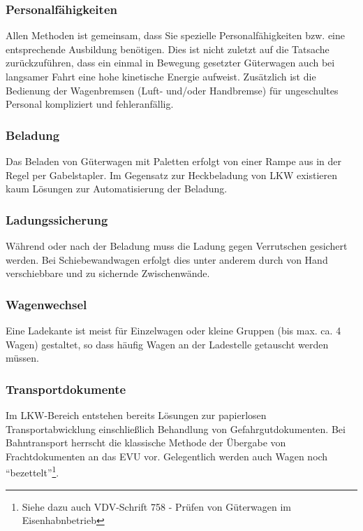 \subsubsection{Personalfähigkeiten}\label{sec:Personal}
Allen Methoden ist gemeinsam, dass Sie spezielle Personalfähigkeiten bzw. eine entsprechende Ausbildung benötigen. Dies ist nicht zuletzt auf die Tatsache zurückzuführen, dass ein einmal in Bewegung gesetzter Güterwagen auch bei langsamer Fahrt eine hohe kinetische Energie aufweist. Zusätzlich ist die Bedienung der Wagenbremsen (Luft- und/oder Handbremse) für ungeschultes Personal kompliziert und fehleranfällig.
\subsubsection{Beladung}
Das Beladen von Güterwagen mit Paletten erfolgt von einer Rampe aus in der Regel per Gabelstapler. Im Gegensatz zur Heckbeladung von LKW existieren kaum Lösungen zur Automatisierung der Beladung. 
\subsubsection{Ladungssicherung}
Während oder nach der Beladung muss die Ladung gegen Verrutschen gesichert werden. Bei Schiebewandwagen erfolgt dies unter anderem durch von Hand verschiebbare und zu sichernde Zwischenwände.
\subsubsection{Wagenwechsel}
Eine Ladekante ist meist für Einzelwagen oder kleine Gruppen (bis max. ca. 4 Wagen) gestaltet, so dass häufig Wagen an der Ladestelle getauscht werden müssen. %
\subsubsection{Transportdokumente}\label{sec:Transdoc}
Im LKW-Bereich entstehen bereits Lösungen zur papierlosen Transportabwicklung einschließlich Behandlung von Gefahrgutdokumenten. Bei Bahntransport herrscht die klassische Methode der Übergabe von Frachtdokumenten an das EVU vor. Gelegentlich werden auch Wagen noch "`bezettelt"'\footnote{Siehe dazu auch VDV-Schrift 758 - Prüfen von Güterwagen im Eisenhabnbetrieb}. %

